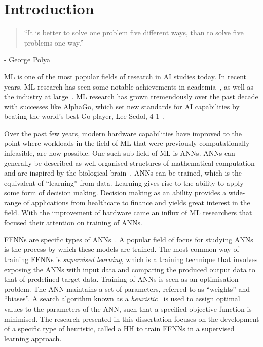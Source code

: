 \chapter{Introduction}\label{chap:introduction}

\begin{quotation}
      ``It is better to solve one problem five different ways, than to solve five problems one way.''
\end{quotation}
\begin{flushright}
      - George Polya
\end{flushright}

\Acf{ML} is one of the most popular fields of research in \acf{AI} studies today. In recent years, \acs{ML} research has seen some notable achievements in academia~\cite{ref:lecun:2015, ref:glorot:2010, ref:goodfellow:2014, ref:vaswani:2017}, as well as the industry at large~\cite{ref:silver:2016, ref:silver:2017, ref:zoph:2017, ref:lewis:2017}.  \acs{ML} research has grown tremendously over the past decade with successes like AlphaGo, which set new standards for \acs{AI} capabilities by beating the world's best Go player, Lee Sedol, 4-1~\cite{ref:silver:2017}.

Over the past few years, modern hardware capabilities have improved to the point where workloads in the field of \acs{ML} that were previously computationally infeasible, are now possible. One such sub-field of \acs{ML} is \acp{ANN}. \acp{ANN} can generally be described as well-organised structures of mathematical computation and are inspired by the biological brain~\cite{ref:engelbrecht:2007}. \acp{ANN} can be trained, which is the equivalent of ``learning'' from data. Learning gives rise to the ability to apply some form of decision making. Decision making as an ability provides a wide-range of applications from healthcare to finance and yields great interest in the field. With the improvement of hardware came an influx of \acs{ML} researchers that focused their attention on training of \acp{ANN}.

\Acfp{FFNN} are specific types of \acp{ANN}~\cite{ref:reed:1999}. A popular field of focus for studying \acp{ANN} is the process by which these models are trained.  The most common way of training \acp{FFNN} is \textit{supervised learning}, which is a training technique that involves exposing the \acp{ANN} with input data and comparing the produced output data to that of predefined target data. Training of \acp{ANN} is seen as an optimisation problem. The \acs{ANN} maintains a set of parameters, referred to as ``weights'' and ``biases''. A search algorithm known as a \textit{heuristic}~\cite{ref:pearl:1984} is used to assign optimal values to the parameters of the \acs{ANN}, such that a specified objective function is minimised. The research presented in this dissertation focuses on the development of a specific type of heuristic, called a \acf{HH} to train \acp{FFNN} in a supervised learning approach.

